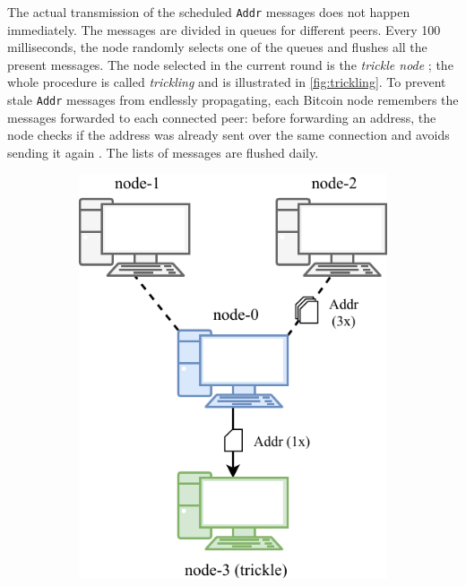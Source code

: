 The actual transmission of the scheduled \texttt{Addr} messages does not happen immediately.
The messages are divided in queues for different peers.
Every \num{100} milliseconds, the node randomly selects one of the queues and flushes all the present messages.
The node selected in the current round is the \textit{trickle node} \cite{deanonymisation_2014}; the whole procedure is called \textit{trickling} and is illustrated in \cref{fig:trickling}.
To prevent stale \texttt{Addr} messages from endlessly propagating, each Bitcoin node remembers the messages forwarded to each connected peer:
before forwarding an address, the node checks if the address was already sent over the same connection and avoids sending it again \cite{eclipse_attack_2015}.
The lists of messages are flushed daily.

\begin{figure}[ht]
	\hspace*{0.2cm}
	\begin{subfigure}{.42\textwidth}
		\vspace*{0.5cm}
		\includegraphics[width=\columnwidth]{figures/trickling_1}

\end{subfigure}
\end{figure}
